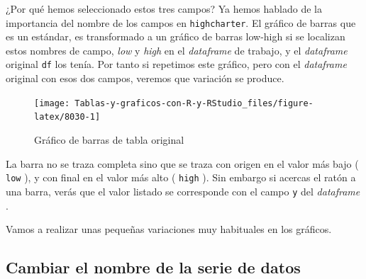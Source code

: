 \documentclass[
]{book}
\newenvironment{Shaded}{\begin{snugshade}}{\end{snugshade}}
\newcommand{\AttributeTok}[1]{\textcolor[rgb]{0.77,0.63,0.00}{#1}}
\newcommand{\ConstantTok}[1]{\textcolor[rgb]{0.00,0.00,0.00}{#1}}
\newcommand{\FunctionTok}[1]{\textcolor[rgb]{0.00,0.00,0.00}{#1}}
\newcommand{\NormalTok}[1]{#1}
\newcommand{\SpecialCharTok}[1]{\textcolor[rgb]{0.00,0.00,0.00}{#1}}
\newcommand{\StringTok}[1]{\textcolor[rgb]{0.31,0.60,0.02}{#1}}
\begin{document}
¿Por qué hemos seleccionado estos tres campos? Ya hemos hablado de la importancia del nombre de los campos en \texttt{highcharter}. El gráfico de barras que es un estándar, es transformado a un gráfico de barras low-high si se localizan estos nombres de campo, \emph{low} y \emph{high} en el \emph{dataframe} de trabajo, y el \emph{dataframe} original \texttt{df} los tenía. Por tanto si repetimos este gráfico, pero con el \emph{dataframe} original con esos dos campos, veremos que variación se produce.

\begin{Shaded}
\end{Shaded}

\begin{figure}[H]

{\centering \texttt{[image: Tablas-y-graficos-con-R-y-RStudio\_files/figure-latex/8030-1]} 

}

\caption{Gráfico de barras de tabla original}\label{fig:8030}
\end{figure}

La barra no se traza completa sino que se traza con origen en el valor más bajo ( \texttt{low} ), y con final en el valor más alto ( \texttt{high} ). Sin embargo si acercas el ratón a una barra, verás que el valor listado se corresponde con el campo \texttt{y} del \emph{dataframe} .

Vamos a realizar unas pequeñas variaciones muy habituales en los gráficos.

\hypertarget{cambiar-el-nombre-de-la-serie-de-datos}{%
\subsection{Cambiar el nombre de la serie de datos}\label{cambiar-el-nombre-de-la-serie-de-datos}}
\end{document}
